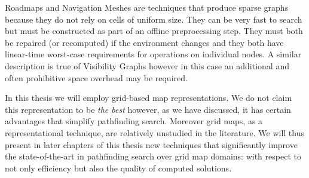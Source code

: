 Roadmaps and Navigation Meshes are techniques that produce sparse graphs because 
they do not rely on cells of uniform size.  They can be very fast to search 
but must be constructed as part of an offline preprocessing step. They must both
be repaired (or recomputed) if the environment changes and they both have 
linear-time worst-case requirements for operations on individual nodes.  
A similar description is true of Visibility Graphs however in this case an additional 
and often prohibitive space overhead may be required.

In this thesis we will employ grid-based map representations. We do not claim this
representation to be \emph{the best} however, as we have discussed, it has certain advantages
that simplify pathfinding search. Moreover grid maps, as a representational technique,
are relatively unstudied in the literature. We will thus present in later chapters of this
thesis new techniques that significantly improve the state-of-the-art in pathfinding search 
over grid map domains: with respect to not only efficiency but also the quality of computed solutions.
